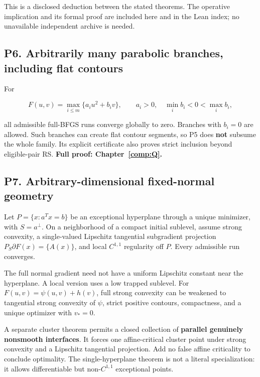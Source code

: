 This is a disclosed deduction between the stated theorems. The operative implication and its formal proof are included here and in the Lean index; no unavailable independent archive is needed.



\subsection{P6. Arbitrarily many parabolic branches, including flat contours}\label{p6.-arbitrarily-many-parabolic-branches-including-flat-contours}

For

\[F(u,v)=\max_{i\le m}\{a_i u^2+b_iv\},\qquad a_i>0,
\quad\min_i b_i<0<\max_i b_i,\]

all admissible full-BFGS runs converge globally to zero. Branches with \(b_i=0\) are allowed. Such branches can create flat contour segments, so P5 does \textbf{not} subsume the whole family. Its explicit certificate also proves strict inclusion beyond eligible-pair RS. \textbf{Full proof: Chapter~\ref{comp:Q}.}



\subsection{P7. Arbitrary-dimensional fixed-normal geometry}\label{p7.-arbitrary-dimensional-fixed-normal-geometry}

Let \(P=\{x:a^Tx=b\}\) be an exceptional hyperplane through a unique minimizer, with \(S=a^\perp\). On a neighborhood of a compact initial sublevel, assume strong convexity, a single-valued Lipschitz tangential subgradient projection \(P_S\partial F(x)=\{A(x)\}\), and local \(C^{1,1}\) regularity off \(P\). Every admissible run converges.

The full normal gradient need not have a uniform Lipschitz constant near the hyperplane. A local version uses a low trapped sublevel. For \(F(u,v)=\psi(u,v)+h(v)\), full strong convexity can be weakened to tangential strong convexity of \(\psi\), strict positive contours, compactness, and a unique optimizer with \(v_*=0\).

A separate cluster theorem permits a closed collection of \textbf{parallel genuinely nonsmooth interfaces}. It forces one affine-critical cluster point under strong convexity and a Lipschitz tangential projection. Add no false affine criticality to conclude optimality. The single-hyperplane theorem is not a literal specialization: it allows differentiable but non-\(C^{1,1}\) exceptional points.

